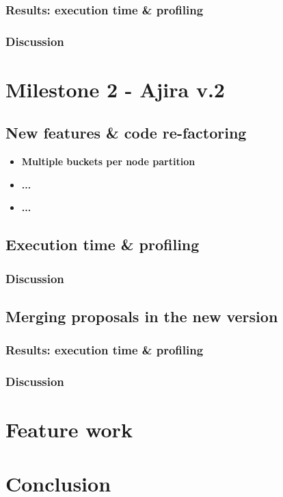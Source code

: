 \subsubsection{Results: execution time \& profiling}
% 
\subsubsection*{Discussion}


\section{Milestone 2 - Ajira v.2}
% 
\subsection{New features \& code re-factoring}
% 
\begin{itemize}
	\item \bf{Multiple buckets per node partition}

	\item \bf{...}

	\item \bf{...}
\end{itemize}
% 
\subsection{Execution time \& profiling}
% 
\subsubsection*{Discussion}
% 
\subsection{Merging proposals in the new version}
% 
\subsubsection{Results: execution time \& profiling}
% 
\subsubsection*{Discussion}

\section*{Feature work}

\section*{Conclusion}
